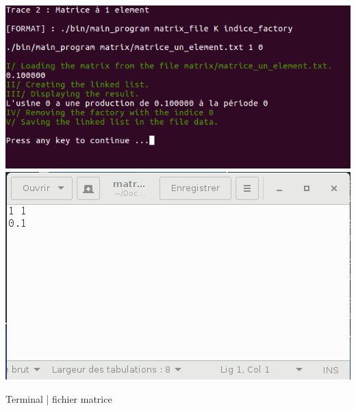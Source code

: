 \documentclass[a4paper]{article}
\begin{document}
\begin{center}
\includegraphics[scale=0.4]{trace_3.png}
\includegraphics[scale=0.4]{matrice_un_element.png}

Terminal | fichier matrice
\end{center}
\end{document}
